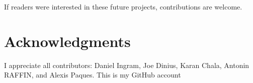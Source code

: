\documentclass{bmvc2k}
\begin{document}
If readers were interested in these future projects, contributions are welcome.



\section{Acknowledgments}

I appreciate all contributors: Daniel Ingram\cite{auther1}, Joe Dinius\cite{auther2}, Karan Chala\cite{auther3}, Antonin RAFFIN\cite{auther4}, and Alexis Paques\cite{auther6}. This is my GitHub account\cite{auther5}


\end{document}
